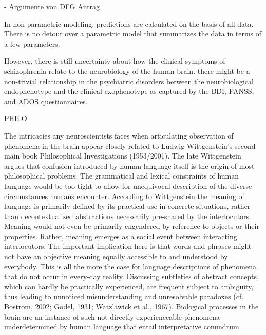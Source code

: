 \documentclass[authoryear,review,3p]{elsarticle}
\begin{document}
- Argumente von DFG Antrag








In non-parametric modeling, predictions are calculated on the basis of all data. There is no detour over a parametric model that summarizes the data in terms of a few parameters.


However, there is still uncertainty about how the clinical symptoms of schizophrenia relate to the neurobiology of the human brain. 
there might be a non-trivial relationship in the psychiatric disorders between the neurobiological endophenotype and the clinical exophenotype as captured by the BDI, PANSS, and ADOS questionnaires.






PHILO


The intricacies any neuroscientists faces when articulating observation of phenomena in the brain appear closely related to Ludwig Wittgenstein's second main book Philosophical Investigations (1953/2001). The late Wittgenstein argues that confusion introduced by human language itself is the origin of most philosophical problems. The grammatical and lexical constraints of human language would be too tight to allow for unequivocal description of the diverse circumstances humans encounter. According to Wittgenstein the meaning of language is primarily defined by its practical use in concrete situations, rather than decontextualized abstractions necessarily pre-shared by the interlocutors. Meaning would not even be primarily engendered by reference to objects or their properties. Rather, meaning emerges as a social event between interacting interlocutors. The important implication here is that words and phrases might not have an objective meaning equally accessible to and understood by everybody. This is all the more the case for language descriptions of phenomena that do not occur in every-day reality. Discussing subtleties of abstract concepts, which can hardly be practically experienced, are frequent subject to ambiguity, thus leading to unnoticed misunderstanding and unresolvable paradoxes (cf. Bostrom, 2002; Gödel, 1931; Watzlawick et al., 1967). Biological processes in the brain are an instance of such not directly experienceable phenomena underdetermined by human language that entail interpretative conundrum.
\end{document}
